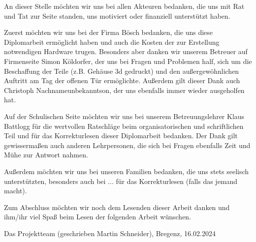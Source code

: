 An dieser Stelle möchten wir uns bei allen Akteuren bedanken, die uns mit Rat und Tat zur Seite standen, uns motiviert oder finanziell unterstützt haben.

Zuerst möchten wir uns bei der Firma Bösch bedanken, die uns diese Diplomarbeit ermöglicht haben und auch die Kosten der zur Erstellung notwendigen Hardware trugen. Besonders aber danken wir unserem Betreuer auf Firmenseite Simon Köldorfer, der uns bei Fragen und Problemen half, sich um die Beschaffung der Teile (z.B. Gehäuse 3d gedruckt) und den außergewöhnlichen Auftritt am Tag der offenen Tür ermöglichte. Außerdem gilt dieser Dank auch Christoph Nachnameunbekanntson, der uns ebenfalls immer wieder ausgeholfen hat.

Auf der Schulischen Seite möchten wir uns bei unserem Betreuungslehrer Klaus Battlogg für die wertvollen Ratschläge beim organisatorischen und schriftlichen Teil und für das Korrekturlesen dieser Diplomarbeit bedanken. Der Dank gilt gewissermaßen auch anderen Lehrpersonen, die sich bei Fragen ebenfalls Zeit und Mühe zur Antwort nahmen.

Außerdem möchten wir uns bei unseren Familien bedanken, die uns stets seelisch unterstützten, besonders auch bei ... für das Korrekturlesen (falls das jemand macht).

Zum Abschluss möchten wir noch dem Lesenden dieser Arbeit danken und ihm/ihr viel Spaß beim Lesen der folgenden Arbeit wünschen.

Das Projektteam (geschrieben Martin Schneider),
Bregenz, 16.02.2024